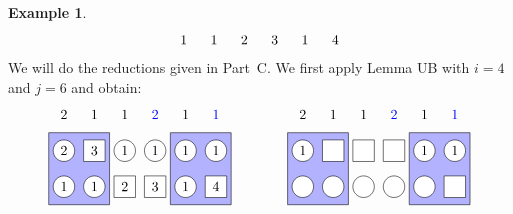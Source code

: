 \documentclass[reqno]{amsart}
\newcommand{\0}{\phantom{c}}
\theoremstyle{plain}
\theoremstyle{definition}
\newtheorem{example}[thm]{Example}
\numberwithin{equation}{section}
\begin{document}
\begin{example}
\[\begin{tikzpicture}[scale=0.9]
  \foreach \i in {1,2,5} { \node at (\i*\sc,\l) {$1$}; }
  \foreach \i in {3} { \node at (\i*\sc,\l) {$2$}; }
  \foreach \i in {4} { \node at (\i*\sc,\l) {$3$}; }
  \foreach \i in {6} { \node at (\i*\sc,\l) {$4$}; }
\end{tikzpicture}
\]
We will do the reductions given in Part~C.
We first apply Lemma UB with $i = 4$ and $j = 6$ and obtain:
\[
\begin{tikzpicture}[scale=0.9]
  \def\sc{0.85}   %
  \def\lll{3}  %
  \def\ll{2}   %
  \def\l{1}   %
  \draw[fill=blue!30] (0.5*\sc,\l-.5) rectangle(2.5*\sc,\ll+.5);
  \draw[fill=blue!30] (4.5*\sc,\l-.5) rectangle(6.5*\sc,\ll+.5);
  \foreach \i in {1,3,4,5,6} { \draw[fill=white] (\i*\sc,\ll) circle (0.3); }
  \foreach \i in {2} { \draw[fill=white] (\i*\sc-.3,\ll-.3) rectangle +(0.6,+0.6); }
  \foreach \i in {1,2,5} { \draw[fill=white] (\i*\sc,\l) circle (0.3); }
  \foreach \i in {3,4,6} { \draw[fill=white] (\i*\sc-.3,\l-.3) rectangle +(0.6,+0.6); }
  \node[blue] at (4*\sc,\lll) {$2$};
  \node[blue] at (6*\sc,\lll) {$1$};
  \foreach \i in {2,3,5} { \node at (\i*\sc,\lll) {$1$}; }
  \foreach \i in {1} { \node at (\i*\sc,\lll) {$2$}; }
  \foreach \i in {3,4,5,6} { \node at (\i*\sc,\ll) {$1$}; }
  \foreach \i in {1} { \node at (\i*\sc,\ll) {$2$}; }
  \foreach \i in {2} { \node at (\i*\sc,\ll) {$3$}; }
  \foreach \i in {1,2,5} { \node at (\i*\sc,\l) {$1$}; }
  \foreach \i in {3} { \node at (\i*\sc,\l) {$2$}; }
  \foreach \i in {4} { \node at (\i*\sc,\l) {$3$}; }
  \foreach \i in {6} { \node at (\i*\sc,\l) {$4$}; }
\end{tikzpicture}
\hspace{40pt}
\begin{tikzpicture}[scale=0.9]
  \def\sc{0.85}   %
  \def\lll{3}  %
  \def\ll{2}   %
  \def\l{1}   %
  \draw[fill=blue!30] (0.5*\sc,\l-.5) rectangle(2.5*\sc,\ll+.5);
  \draw[fill=blue!30] (4.5*\sc,\l-.5) rectangle(6.5*\sc,\ll+.5);
  \foreach \i in {1,5,6} { \draw[fill=white] (\i*\sc,\ll) circle (0.3); }
  \foreach \i in {2,3,4} { \draw[fill=white] (\i*\sc-.3,\ll-.3) rectangle +(0.6,+0.6); }
  \foreach \i in {1,2,3,4,5} { \draw[fill=white] (\i*\sc,\l) circle (0.3); }
  \foreach \i in {6} { \draw[fill=white] (\i*\sc-.3,\l-.3) rectangle +(0.6,+0.6); }
  \node[blue] at (4*\sc,\lll) {$2$};
  \node[blue] at (6*\sc,\lll) {$1$};
  \foreach \i in {2,3,5} { \node at (\i*\sc,\lll) {$1$}; }
  \foreach \i in {1} { \node at (\i*\sc,\lll) {$2$}; }
  \foreach \i in {1,5,6} { \node at (\i*\sc,\ll) {$1$}; }

\end{tikzpicture}\]
\end{example}
\end{document}
